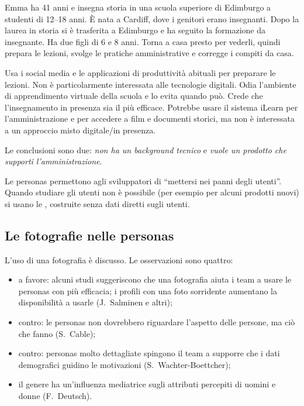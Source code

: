 \begin{esempio}
Emma ha 41 anni e insegna storia in una scuola superiore di Edimburgo a studenti di 12--18 anni. È nata a Cardiff,
dove i genitori erano insegnanti. Dopo la laurea in storia si è trasferita a Edimburgo e ha seguito la formazione
da insegnante. Ha due figli di 6 e 8 anni. Torna a casa presto per vederli, quindi prepara le lezioni, svolge le pratiche amministrative e corregge i compiti da casa.

Usa i social media e le applicazioni di produttività abituali per preparare le lezioni. Non è particolarmente
interessata alle tecnologie digitali. Odia l'ambiente di apprendimento virtuale della scuola e lo evita quando può.
Crede che l'insegnamento in presenza sia il più efficace. Potrebbe usare il sistema iLearn per l'amministrazione e
per accedere a film e documenti storici, ma non è interessata a un approccio misto digitale/in presenza.

Le conclusioni sono due: \emph{non ha un background tecnico} e \emph{vuole un prodotto che supporti
l'amministrazione}.
\end{esempio}

\begin{idea}
Le personas permettono agli sviluppatori di ``mettersi nei panni degli utenti''. Quando studiare gli utenti non è
possibile (per esempio per alcuni prodotti nuovi) si usano le , costruite senza
dati diretti sugli utenti.
\end{idea}

\subsection{Le fotografie nelle personas}
\label{sec:feature-foto}

L'uso di una fotografia è discusso. Le osservazioni sono quattro:
\begin{itemize}
  \item a favore: alcuni studi suggeriscono che una fotografia aiuta i team a usare le personas con più efficacia; i
    profili con una foto sorridente aumentano la disponibilità a usarle (J.~Salminen e altri);
  \item contro: le personas non dovrebbero riguardare l'aspetto delle persone, ma ciò che fanno (S.~Cable);
  \item contro: personas molto dettagliate spingono il team a supporre che i dati demografici guidino le motivazioni
    (S.~Wachter-Boettcher);
  \item il genere ha un'influenza mediatrice sugli attributi percepiti di uomini e donne (F.~Deutsch).
\end{itemize}

